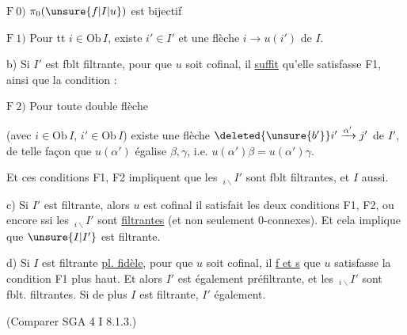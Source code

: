 
$\mathrm{F}\ 0)$ $\pi_0(\unsure{f|I|u})$ est bijectif

$\mathrm{F}\ 1)$ Pour tt $i\in\mathrm{Ob}\,I$, existe $i'\in I'$ et une flèche $i\longrightarrow u(i')$ de $I$.



b) Si $I'$ est fblt filtrante, pour que $u$ soit cofinal, il \uline{suffit} qu'elle satisfasse F1, ainsi que la condition :

$\mathrm{F}\ 2)$ Pour toute double flèche


 (avec $i\in\mathrm{Ob}\,I$, $i'\in\mathrm{Ob}\,I$) existe une flèche $\deleted{\unsure{b'}}i'\xrightarrow{\alpha'}j'$ de $I'$, de telle façon que $u(\alpha')$ égalise $\beta,\gamma$, i.e. $u(\alpha')\beta=u(\alpha')\gamma$.

Et ces conditions F1, F2 impliquent que les $\,{}_{i\backslash}I'$ sont fblt filtrantes, et $I$ aussi.


c) Si $I'$ est filtrante, alors $u$ est cofinal  il satisfait les deux conditions F1, F2, ou  encore ssi les $\,{}_{i\backslash}I'$ sont  \uline{filtrantes} (et non seulement $0$-connexes). Et cela implique que $\unsure{I|I'}$ est  filtrante.

d) Si $I$ est filtrante   \uline{pl. fidèle}, pour que $u$ soit cofinal, il \uline{f et s} que $u$ satisfasse la condition F1 plus haut. Et alors $I'$ est également   préfiltrante, et les $\,{}_{i\backslash}I'$ sont fblt. filtrantes. Si de plus $I$ est   filtrante,  $I'$  également.

(Comparer SGA 4 I 8.1.3.)
